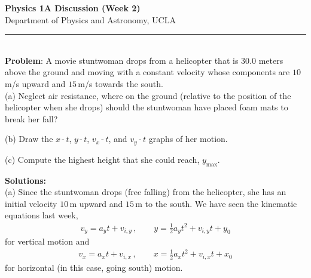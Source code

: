 \documentclass[11pt]{article}
\begin{document}
\Large \noindent \textbf{Physics 1A Discussion (Week 2)}\\
\normalsize
Department of Physics and Astronomy, UCLA\\
\noindent\rule{8cm}{0.4pt}\\


\noindent\textbf{Problem}: A movie stuntwoman drops from a helicopter that is $30.0$ meters above the ground and moving with a constant velocity whose components are $10$\,m/s upward and $15$\,m/s towards the south. \\

(a) Neglect air resistance, where on the ground (relative to the position of the helicopter when she drops) should the stuntwoman have placed foam mats to break her fall?\\

\hfill\break
\hfill\break
\hfill\break
\hfill\break
\hfill\break
\hfill\break
\hfill\break
\hfill\break
\hfill\break

(b) Draw the $x$\,-\,$t$, $y$\,-\,$t$, $v_x$\,-\,$t$, and $v_y$\,-\,$t$ graphs of her motion.\\

\hfill\break
\hfill\break
\hfill\break
\hfill\break
\hfill\break
\hfill\break
\hfill\break
\hfill\break
\hfill\break
\hfill\break
\hfill\break
\hfill\break

(c) Compute the highest height that she could reach, $y_{\max}$. 






\newpage
\textbf{Solutions:}\\

(a) Since the stuntwoman drops (free falling) from the helicopter, she has an initial velocity $10\,$m upward and $15\,$m to the south. We have seen the kinematic equations last week, 
\begin{align*}
v_y = a_y t+ v_{i,y}\,,\qquad y = \frac{1}{2}a_y t^2 + v_{i,y} t + y_0
\end{align*}
for vertical motion and
\begin{align*}
v_x = a_x t+ v_{i,x}\,,\qquad 
x = \frac{1}{2}a_x t^2 + v_{i,x} t + x_0
\end{align*}
for horizontal (in this case, going south) motion.\\
\end{document}
